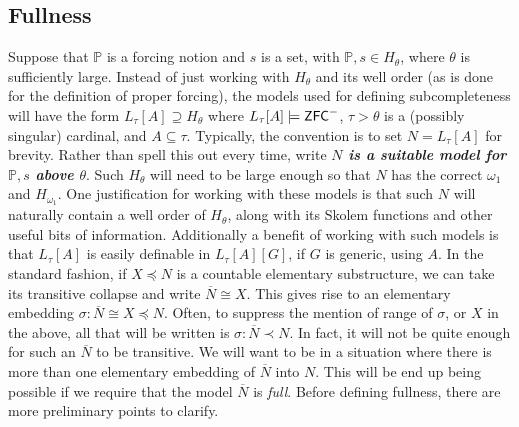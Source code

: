\documentclass{amsart}
\theoremstyle{definition}
\theoremstyle{remark}
\renewcommand{\P}{\mathbb{P}}
\newcommand{\N}{{\overline{N}}}
\newcommand{\ZFC}{\textup{\ensuremath{\textsf{ZFC}}}}
\begin{document}
\subsection{Fullness}
\label{subsec:fullness}
Suppose that $\P$ is a forcing notion and $s$ is a set, with $\P, s \in H_\theta$, where $\theta$ is sufficiently large. Instead of just working with $H_\theta$ and its well order (as is done for the definition of proper forcing), the models used for defining subcompleteness will have the form $L_\tau[A] \supseteq H_\theta$ where $L_\tau[A] \models \ZFC^-$, $\tau>\theta$ is a (possibly singular) cardinal, and $A \subseteq \tau$. Typically, the convention is to set $N=L_\tau[A]$ for brevity. Rather than spell this out every time, write \emph{\textbf{$N$ is a suitable model for $\P,s$ above $\theta$}}.
Such $H_\theta$ will need to be large enough so that $N$ has the correct $\omega_1$ and $H_{\omega_1}$. One justification for working with these models is that such $N$ will naturally contain a well order of $H_\theta$, along with its Skolem functions and other useful bits of information. Additionally a benefit of working with such models is that $L_\tau[A]$ is easily definable in $L_\tau[A][G]$, if $G$ is generic, using $A$.
In the standard fashion, if $X \preccurlyeq N$ is a countable elementary substructure, we can take its transitive collapse and write $\N \cong X$. This gives rise to an elementary embedding 
$\sigma: \N \cong X \preccurlyeq N.$
Often, to suppress the mention of range of $\sigma$, or $X$ in the above, all that will be written is $\sigma: \N \prec N$.
In fact, it will not be quite enough for such an $\N$ to be transitive. We will want to be in a
situation where there is more than one elementary embedding of \(\N\) into \(N\).
This will be end up being possible if we require that the model \(\N\) is \emph{full}.
Before defining fullness, there are more preliminary points to clarify.
\end{document}
